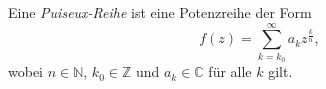  \begin{definition}
    Eine \emph{Puiseux-Reihe} ist eine Potenzreihe der Form
%
    \[
        f(z) = \sum_{k=k_0}^{\infty} a_k z^{\frac{k}{n}},
    \]
    wobei $n \in \mathbb{N}$, $k_0 \in \mathbb{Z}$ und $a_k \in \mathbb{C}$ für alle $k$ gilt.
 
 \end{definition}
